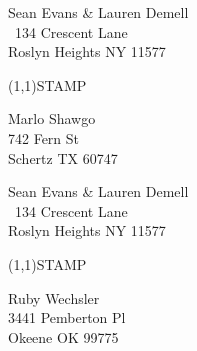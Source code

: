\documentclass[12pt]{article}
\begin{document}
\clearpage

\begin{minipage}{.5\linewidth} \noindent
Sean Evans \& Lauren Demell\\\ 
134 Crescent Lane\\ 
Roslyn Heights NY 11577
\end{minipage}
\begin{minipage}{.5\linewidth \hspace{-.2in} \vspace{-.3in}}
\begin{flushright}
\framebox(1,1){STAMP}
\end{flushright}
\end{minipage}

\begin{center} \begin{Huge} \vspace*{\fill}
Marlo Shawgo\\
742 Fern St\\
Schertz TX 60747\\
\vspace{\fill} \end{Huge} \end{center}

\clearpage

\begin{minipage}{.5\linewidth} \noindent
Sean Evans \& Lauren Demell\\\ 
134 Crescent Lane\\ 
Roslyn Heights NY 11577
\end{minipage}
\begin{minipage}{.5\linewidth \hspace{-.2in} \vspace{-.3in}}
\begin{flushright}
\framebox(1,1){STAMP}
\end{flushright}
\end{minipage}

\begin{center} \begin{Huge} \vspace*{\fill}
Ruby Wechsler\\
3441 Pemberton Pl\\
Okeene OK 99775\\
\vspace{\fill} \end{Huge} \end{center}

\clearpage
\end{document}
